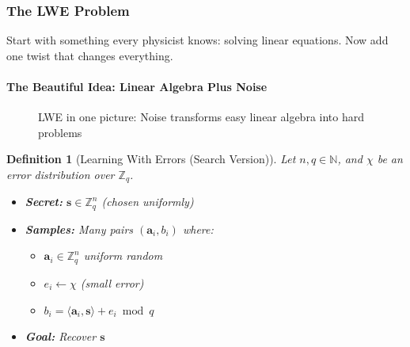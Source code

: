 \documentclass[11pt,a4paper]{article}
\newtheorem{definition}{Definition}
\begin{document}
\subsubsection{The LWE Problem}

Start with something every physicist knows: solving linear equations. Now add one twist that changes everything.

\paragraph{The Beautiful Idea: Linear Algebra Plus Noise}

\begin{figure}[h]
\centering
{}
\caption{LWE in one picture: Noise transforms easy linear algebra into hard problems}
\end{figure}

\begin{definition}[Learning With Errors (Search Version)]
Let $n, q \in \mathbb{N}$, and $\chi$ be an error distribution over $\mathbb{Z}_q$.
\begin{itemize}
    \item \textbf{Secret:} $\mathbf{s} \in \mathbb{Z}_q^n$ (chosen uniformly)
    \item \textbf{Samples:} Many pairs $(\mathbf{a}_i, b_i)$ where:
    \begin{itemize}
        \item $\mathbf{a}_i \in \mathbb{Z}_q^n$ uniform random
        \item $e_i \leftarrow \chi$ (small error)
        \item $b_i = \langle \mathbf{a}_i, \mathbf{s} \rangle + e_i \bmod q$
    \end{itemize}
    \item \textbf{Goal:} Recover $\mathbf{s}$
\end{itemize}
\end{definition}
\end{document}
